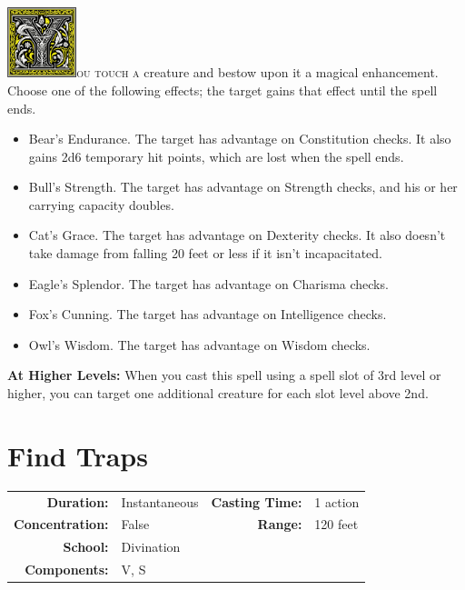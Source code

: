 \documentclass[12pt,showtrims]{memoir}
\begin{document}
\vspace{1\baselineskip}\noindent
\lettrine[lines=4]{\includegraphics[height=58pt]{initials/Y.png}}{ou touch a} creature and bestow upon it a magical enhancement. Choose one of the following effects; the target gains that effect until the spell ends. 
\begin{itemize}
\item Bear’s Endurance. The target has advantage on Constitution checks. It also gains 2d6 temporary hit points, which are lost when the spell ends. 
\item Bull’s Strength. The target has advantage on Strength checks, and his or her carrying capacity doubles. 
\item Cat’s Grace. The target has advantage on Dexterity checks. It also doesn’t take damage from falling 20 feet or less if it isn’t incapacitated.
\item Eagle’s Splendor. The target has advantage on Charisma checks. 
\item Fox’s Cunning. The target has advantage on Intelligence checks. 
\item Owl’s Wisdom. The target has advantage on Wisdom checks.
\end{itemize}


\vspace{8pt} \noindent\textbf{At Higher Levels:} When you cast this spell using a spell slot of 3rd level or higher, you can target one additional creature for each slot level above 2nd.
\newpage
\section*{Find Traps}

{
\small\centering\vspace{-6pt}
\begin{tabular}{rlrl}
\toprule

\textbf{Duration:} & Instantaneous &
\textbf{Casting Time:} & 1 action \\
\textbf{Concentration:} & False &
\textbf{Range:} & 120 feet \\
\textbf{School:} & Divination \\
\textbf{Components:} & \multicolumn{3}{p{0.7\textwidth}}{V, S}\\

\bottomrule
\end{tabular}
}
\end{document}
